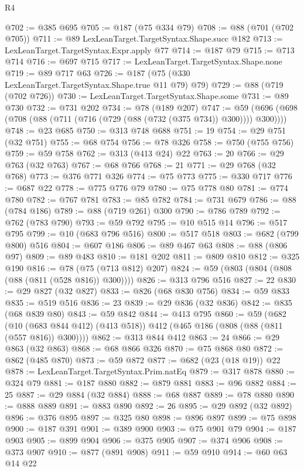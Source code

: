 \begin{lexlean}{R4}
\begin{coremodule}
@702 := @385 @695
@705 := @187 (@75 @334 @79)
@708 := @88 (@701 (@702 @705))
@711 := @89 LexLeanTarget.TargetSyntax.Shape.succ @182
@713 := LexLeanTarget.TargetSyntax.Expr.apply @77
@714 := @187 @79
@715 := @713 @714
@716 := @697 @715
@717 := LexLeanTarget.TargetSyntax.Shape.none
@719 := @89 @717 @63
@726 := @187 (@75 (@330 LexLeanTarget.TargetSyntax.Shape.true @11 @79) @79)
@729 := @88 (@719 (@702 @726))
@730 := LexLeanTarget.TargetSyntax.Shape.some
@731 := @89 @730
@732 := @731 @202
@734 := @78 (@189 @207)
@747 := @59 (@696 (@698 (@708 (@88 (@711 (@716 (@729 (@88 (@732 (@375 @734)) @300)))) @300))))
@748 := @23 @685
@750 := @313 @748 @688
@751 := 19
@754 := @29 @751 (@32 @751)
@755 := @68 @754
@756 := @78 @326
@758 := @750 (@755 @756)
@759 := @59 @758
@762 := @313 (@413 @24) @22
@763 := 20
@766 := @29 @763 (@32 @763)
@767 := @68 @766
@768 := 21
@771 := @29 @768 (@32 @768)
@773 := @376 @771 @326
@774 := @75 @773
@775 := @330 @717
@776 := @687 @22
@778 := @775 @776 @79
@780 := @75 @778 @80
@781 := @774 @780
@782 := @767 @781
@783 := @85 @782
@784 := @731 @679
@786 := @88 (@784 @186)
@789 := @88 (@719 @261) @300
@790 := @786 @789
@792 := @762 (@783 @790)
@793 := @59 @792
@795 := @10 @515 @14
@796 := @517 @795
@799 := @10 (@683 @796 @516)
@800 := @517 @518
@803 := @682 (@799 @800) @516
@804 := @607 @186
@806 := @89 @467 @63
@808 := @88 (@806 @97)
@809 := @89 @483
@810 := @181 @202
@811 := @809 @810
@812 := @325 @190
@816 := @78 (@75 (@713 @812) @207)
@824 := @59 (@803 (@804 (@808 (@88 (@811 (@528 @816)) @300))))
@826 := @313 @796 @516
@827 := 22
@830 := @29 @827 (@32 @827)
@833 := @826 (@68 @830 @756)
@834 := @59 @833
@835 := @519 @516
@836 := 23
@839 := @29 @836 (@32 @836)
@842 := @835 (@68 @839 @80)
@843 := @59 @842
@844 := @413 @795
@860 := @59
    (@682 (@10 (@683 @844 @412) (@413 @518)) @412 (@465 @186 (@808 (@88 (@811 (@557 @816)) @300))))
@862 := @313 @844 @412
@863 := 24
@866 := @29 @863 (@32 @863)
@868 := @68 @866 @326
@870 := @75 @868 @80
@872 := @862 (@485 @870)
@873 := @59 @872
@877 := @682 (@23 (@18 @19)) @22
@878 := LexLeanTarget.TargetSyntax.Prim.natEq
@879 := @317 @878
@880 := @324 @79
@881 := @187 @880
@882 := @879 @881
@883 := @96 @882
@884 := 25
@887 := @29 @884 (@32 @884)
@888 := @68 @887
@889 := @78 @880
@890 := @888 @889
@891 := @883 @890
@892 := 26
@895 := @29 @892 (@32 @892)
@896 := @376 @895
@897 := @325 @80
@898 := @896 @897
@899 := @75 @898
@900 := @187 @391
@901 := @389 @900
@903 := @75 @901 @79
@904 := @187 @903
@905 := @899 @904
@906 := @375 @905
@907 := @374 @906
@908 := @373 @907
@910 := @877 (@891 @908)
@911 := @59 @910
@914 := @60 @63 @14 @22

\end{coremodule}
\end{lexlean}
